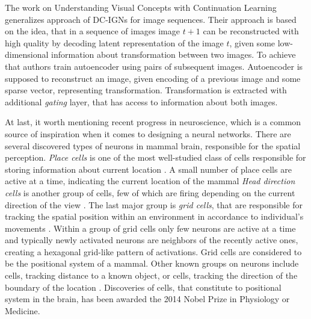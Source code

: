 The work on Understanding Visual Concepts with Continuation Learning \cite{Whitney2016} generalizes approach of DC-IGNs for image sequences.
Their approach is based on the idea, that in a sequence of images image $t+1$ can be reconstructed with high quality by decoding latent representation of the image $t$, given some low-dimensional information about transformation between two images.
To achieve that authors train autoencoder using pairs of subsequent images.
Autoencoder is supposed to reconstruct an image, given encoding of a previous image and some sparse vector, representing transformation.
Transformation is extracted with additional \textit{gating} layer, that has access to information about both images.

At last, it worth mentioning recent progress in neuroscience, which is a common source of inspiration when it comes to designing a neural networks.
There are several discovered types of neurons in mammal brain, responsible for the spatial perception.
\textit{Place cells} is one of the most well-studied class of cells responsible for storing information about current location \cite{Fenton2009, Hartley2014}.
A small number of place cells are active at a time, indicating the current location of the mammal
\textit{Head direction cells} is another group of cells, few of which are firing depending on the current direction of the view \cite{Taube1990, Taube1990a}.
The last major group is \textit{grid cells}, that are responsible for tracking the spatial position within an environment in accordance to individual's movements \cite{Moser2008}.
Within a group of grid cells only few neurons are active at a time and typically newly activated neurons are neighbors of the recently active ones, creating a hexagonal grid-like pattern of activations.
Grid cells are considered to be the positional system of a mammal.
Other known groups on neurons include cells, tracking distance to a known object, or cells, tracking the direction of the boundary of the location \cite{Lever2009}.
Discoveries of cells, that constitute to positional system in the brain, has been awarded the 2014 Nobel Prize in Physiology or Medicine.
